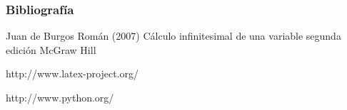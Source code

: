 \documentclass{beamer}
\begin{document}
\begin{frame}
  \frametitle{Bibliografía}

  \begin{thebibliography}{10}

    \beamertemplatebookbibitems
    Juan de Burgos Román (2007) Cálculo infinitesimal de una variable segunda edición McGraw Hill
    
    \beamertemplatebookbibitems
    http://www.latex-project.org/
    
    \beamertemplatebookbibitems
    http://www.python.org/
    
      
    
      \end{thebibliography}
\end{frame}
\end{document}
